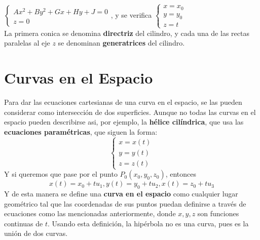 \documentclass[11pt,a4paper]{article}
\begin{document}
$\begin{cases} Ax^2+By^2+Gx+Hy+J=0 \\ z=0\end{cases}$, y se verifica $\begin{cases} x=x_0 \\ y=y_0 \\ z=t \end{cases}$\\

La primera conica se denomina \textbf{directriz} del cilindro, y cada una de las rectas paralelas al eje $z$ se denominan \textbf{generatrices} del cilindro.

\section{Curvas en el Espacio}
Para dar las ecuaciones cartesianas de una curva en el espacio, se las pueden considerar como intersecci\'on de dos superficies. Aunque no todas las curvas en el espacio pueden describirse asi, por ejemplo, la \textbf{h\'elice cil\'indrica}, que usa las \textbf{ecuaciones param\'etricas}, que siguen la forma:
$$\begin{cases} x = x(t) \\ y = y(t) \\ z = z(t) \end{cases}$$
Y si queremos que pase por el punto $P_0(x_0,y_0,z_0)$, entonces 
$$x(t) = x_0+tu_1, y(t) = y_0+tu_2, x(t) = z_0+tu_3$$
Y de esta manera se define una \textbf{curva en el espacio} como cualquier lugar geom\'etrico tal que las coordenadas de sus puntos puedan definirse a trav\'es de ecuaciones como las mencionadas anteriormente, donde $x,y,z$ son funciones continuas de $t$. Usando esta definici\'on, la hip\'erbola no es una curva, pues es la uni\'on de dos curvas.
\end{document}
